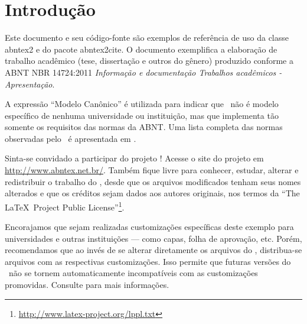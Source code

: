 

\chapter{Introdução}
\label{intro}

Este documento e seu código-fonte são exemplos de referência de uso da classe \textsf{abntex2} e do pacote \textsf{abntex2cite}. O documento exemplifica a elaboração de trabalho acadêmico (tese, dissertação e outros do gênero) produzido conforme a ABNT NBR 14724:2011 \emph{Informação e documentação Trabalhos acadêmicos - Apresentação}.

A expressão ``Modelo Canônico'' é utilizada para indicar que \abnTeX\ não é modelo específico de nenhuma universidade ou instituição, mas que implementa tão somente os requisitos das normas da ABNT. Uma lista completa das normas observadas pelo \abnTeX\ é apresentada em .

Sinta-se convidado a participar do projeto \abnTeX! Acesse o site do projeto em \url{http://www.abntex.net.br/}. Também fique livre para conhecer, estudar, alterar e redistribuir o trabalho do \abnTeX, desde que os arquivos modificados tenham seus nomes alterados e que os créditos sejam dados aos autores originais, nos termos da ``The \LaTeX\ Project Public License''\footnote{\url{http://www.latex-project.org/lppl.txt}}.

Encorajamos que sejam realizadas customizações específicas deste exemplo para universidades e outras instituições --- como capas, folha de aprovação, etc. Porém, recomendamos que ao invés de se alterar diretamente os arquivos do \abnTeX, distribua-se arquivos com as respectivas customizações. Isso permite que futuras versões do \abnTeX~não se tornem automaticamente incompatíveis com as customizações promovidas. Consulte  para mais informações.

